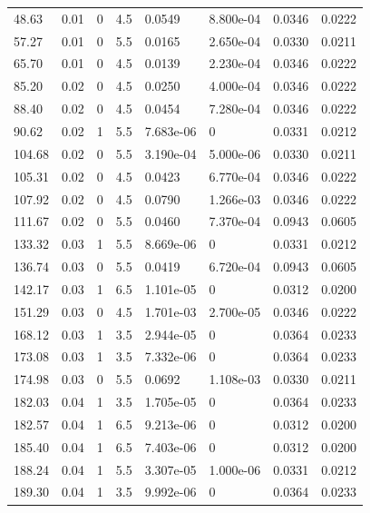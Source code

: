 \documentclass[preview]{standalone}
\begin{document}
{{\begin{tabular}{L{1.2cm}C{1.2cm} C{0.3cm}C{0.5cm} C{1.4cm}C{1.4cm} C{1.4cm}C{1.4cm}}
  48.63  &  0.01  & 0     & 4.5 &  0.0549  & 8.800e-04  & 0.0346 &  0.0222   \\ 
  57.27  &  0.01  & 0     & 5.5 &  0.0165  & 2.650e-04  & 0.0330 &  0.0211   \\ 
  65.70  &  0.01  & 0     & 4.5 &  0.0139  & 2.230e-04  & 0.0346 &  0.0222   \\ 
  85.20  &  0.02  & 0     & 4.5 &  0.0250  & 4.000e-04  & 0.0346 &  0.0222   \\ 
  88.40  &  0.02  & 0     & 4.5 &  0.0454  & 7.280e-04  & 0.0346 &  0.0222   \\ 
  90.62  &  0.02  & 1     & 5.5 &  7.683e-06  & 0  & 0.0331 &  0.0212   \\ 
  104.68  &  0.02  & 0     & 5.5 &  3.190e-04  & 5.000e-06  & 0.0330 &  0.0211   \\ 
  105.31  &  0.02  & 0     & 4.5 &  0.0423  & 6.770e-04  & 0.0346 &  0.0222   \\ 
  107.92  &  0.02  & 0     & 4.5 &  0.0790  & 1.266e-03  & 0.0346 &  0.0222   \\ 
  111.67  &  0.02  & 0     & 5.5 &  0.0460  & 7.370e-04  & 0.0943 &  0.0605   \\ 
  133.32  &  0.03  & 1     & 5.5 &  8.669e-06  & 0  & 0.0331 &  0.0212   \\ 
  136.74  &  0.03  & 0     & 5.5 &  0.0419  & 6.720e-04  & 0.0943 &  0.0605   \\ 
  142.17  &  0.03  & 1     & 6.5 &  1.101e-05  & 0  & 0.0312 &  0.0200   \\ 
  151.29  &  0.03  & 0     & 4.5 &  1.701e-03  & 2.700e-05  & 0.0346 &  0.0222   \\ 
  168.12  &  0.03  & 1     & 3.5 &  2.944e-05  & 0  & 0.0364 &  0.0233   \\ 
  173.08  &  0.03  & 1     & 3.5 &  7.332e-06  & 0  & 0.0364 &  0.0233   \\ 
  174.98  &  0.03  & 0     & 5.5 &  0.0692  & 1.108e-03  & 0.0330 &  0.0211   \\ 
  182.03  &  0.04  & 1     & 3.5 &  1.705e-05  & 0  & 0.0364 &  0.0233   \\ 
  182.57  &  0.04  & 1     & 6.5 &  9.213e-06  & 0  & 0.0312 &  0.0200   \\ 
  185.40  &  0.04  & 1     & 6.5 &  7.403e-06  & 0  & 0.0312 &  0.0200   \\ 
  188.24  &  0.04  & 1     & 5.5 &  3.307e-05  & 1.000e-06  & 0.0331 &  0.0212   \\ 
  189.30  &  0.04  & 1     & 3.5 &  9.992e-06  & 0  & 0.0364 &  0.0233   \\ 

\end{tabular}}}
\end{document}
